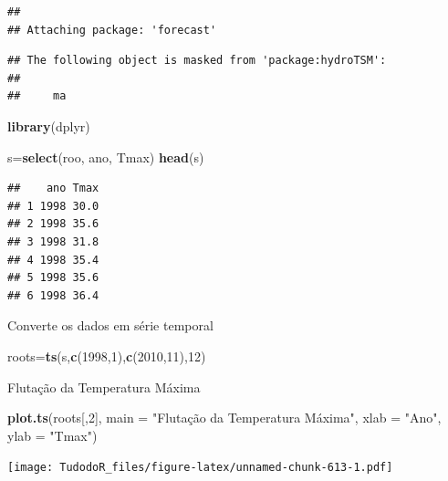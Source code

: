 \documentclass[
]{book}
\newenvironment{Shaded}{\begin{snugshade}}{\end{snugshade}}
\newcommand{\DataTypeTok}[1]{\textcolor[rgb]{0.13,0.29,0.53}{#1}}
\newcommand{\DecValTok}[1]{\textcolor[rgb]{0.00,0.00,0.81}{#1}}
\newcommand{\KeywordTok}[1]{\textcolor[rgb]{0.13,0.29,0.53}{\textbf{#1}}}
\newcommand{\NormalTok}[1]{#1}
\newcommand{\StringTok}[1]{\textcolor[rgb]{0.31,0.60,0.02}{#1}}
\begin{document}
\begin{verbatim}
## 
## Attaching package: 'forecast'
\end{verbatim}

\begin{verbatim}
## The following object is masked from 'package:hydroTSM':
## 
##     ma
\end{verbatim}

\begin{Shaded}
\begin{Highlighting}[]
\KeywordTok{library}\NormalTok{(dplyr)}
\end{Highlighting}
\end{Shaded}

\begin{Shaded}
\begin{Highlighting}[]
\NormalTok{s=}\KeywordTok{select}\NormalTok{(roo, ano, Tmax)}
\KeywordTok{head}\NormalTok{(s)}
\end{Highlighting}
\end{Shaded}

\begin{verbatim}
##    ano Tmax
## 1 1998 30.0
## 2 1998 35.6
## 3 1998 31.8
## 4 1998 35.4
## 5 1998 35.6
## 6 1998 36.4
\end{verbatim}

Converte os dados em série temporal

\begin{Shaded}
\begin{Highlighting}[]
\NormalTok{roots=}\KeywordTok{ts}\NormalTok{(s,}\KeywordTok{c}\NormalTok{(}\DecValTok{1998}\NormalTok{,}\DecValTok{1}\NormalTok{),}\KeywordTok{c}\NormalTok{(}\DecValTok{2010}\NormalTok{,}\DecValTok{11}\NormalTok{),}\DecValTok{12}\NormalTok{)}
\end{Highlighting}
\end{Shaded}

Flutação da Temperatura Máxima

\begin{Shaded}
\begin{Highlighting}[]
\KeywordTok{plot.ts}\NormalTok{(roots[,}\DecValTok{2}\NormalTok{], }\DataTypeTok{main =} \StringTok{"Flutação da Temperatura Máxima"}\NormalTok{, }\DataTypeTok{xlab =} \StringTok{"Ano"}\NormalTok{, }\DataTypeTok{ylab =} \StringTok{"Tmax"}\NormalTok{)}
\end{Highlighting}
\end{Shaded}

\texttt{[image: TudodoR\_files/figure-latex/unnamed-chunk-613-1.pdf]}
\end{document}
